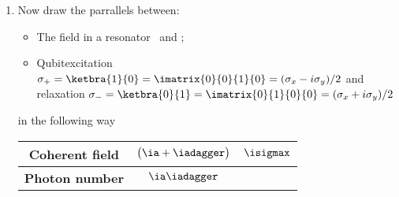 \begin{enumerate}
 	\item Now draw the parrallels between:
 	
 	\begin{itemize}
 		\item The field in a resonator \hfill \ia\ and \iadagger;
 		\item Qubit\hfill excitation $ \sigma_{+} = \ketbra{1}{0} = \imatrix{0}{0}{1}{0} = (\sigma_x-i\sigma_y)/2$ and relaxation $ \sigma_{-} = \ketbra{0}{1} = \imatrix{0}{1}{0}{0} = (\sigma_x+i\sigma_y)/2$
 		
 	\end{itemize}
 	in the following way
 	
 	\begin{center}
 		\begin{tabular}{|c|c|c|}
 			\hline 
 			\textbf{Coherent field} & $ \big(\ia + \iadagger\big) $ & $ \isigmax $ \\ 
 			\hline 
 			\textbf{Photon number} & $ \ia\iadagger $& \isigmaz \\ 
 			\hline 
 		\end{tabular} 
 	\end{center}

\end{enumerate}
\newpage 